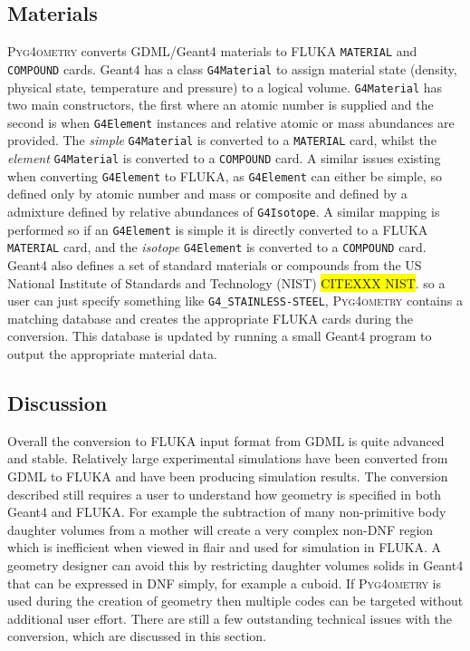 \documentclass[final,5p,times,twocolumn]{elsarticle}
\newcommand{\pyinline}[1]{\lstinline[postbreak={}]{#1}}
\newcommand{\cpinline}[1]{\lstinline[postbreak={}]{#1}}
\newcommand{\fluka}[1]{\texttt{\MakeUppercase{#1}}}
\newcommand{\PYGEOMETRY}{\textsc{Pyg4ometry}}
\begin{document}
\subsection{Materials}
\PYGEOMETRY{} converts GDML/Geant4 materials to FLUKA \verb|MATERIAL| and \verb|COMPOUND| cards.
Geant4 has a class \cpinline{G4Material} to assign material state (density, physical state, temperature and pressure) 
to a logical volume. \cpinline{G4Material} has two main constructors, the first where an atomic number is supplied and 
the second is when \cpinline{G4Element} instances and relative atomic or mass abundances are provided. The {\em simple}
\cpinline{G4Material} is converted to a \fluka{material} card, whilst the {\em element} \cpinline{G4Material}  is converted to a 
\fluka{compound} card. A similar issues existing when converting \cpinline{G4Element} to FLUKA, as \cpinline{G4Element}
can either be simple, so defined only by atomic number and mass or composite and defined by a admixture defined by 
relative abundances of \cpinline{G4Isotope}. A similar mapping is performed so if an \cpinline{G4Element} is simple it is 
directly converted to a FLUKA \fluka{MATERIAL} card, and the {\it isotope} \cpinline{G4Element} is converted to a \fluka{compound}
card. Geant4 also defines a set of standard materials \cite{Geant4MaterialDB} or compounds from the US National Institute 
of Standards and Technology (NIST) \colorbox{yellow}{CITEXXX NIST}. so a user can just specify something like 
\pyinline{G4_STAINLESS-STEEL}, \PYGEOMETRY{}  contains a matching database and creates the appropriate FLUKA 
cards during the conversion. This database is updated by running a small Geant4 program to output the appropriate
material data.

\subsection{Discussion}
Overall the conversion to FLUKA input format from GDML is quite 
advanced and stable. Relatively large experimental simulations 
have been converted from GDML to FLUKA and have been producing 
simulation results. The conversion described still requires a user to
understand how geometry is specified in both Geant4 and FLUKA. For 
example the subtraction of many non-primitive body daughter volumes from 
a mother will create a very complex non-DNF region which is inefficient when viewed in 
flair and used for simulation in FLUKA. A geometry designer can avoid this by
restricting daughter volumes solids in Geant4 that can be expressed in DNF simply,
for example a cuboid.  If \PYGEOMETRY{} is used during the creation of
 geometry then multiple codes can be targeted without additional user effort. 
There are still a few outstanding technical issues with the conversion, which are discussed 
in this section.
\end{document}
